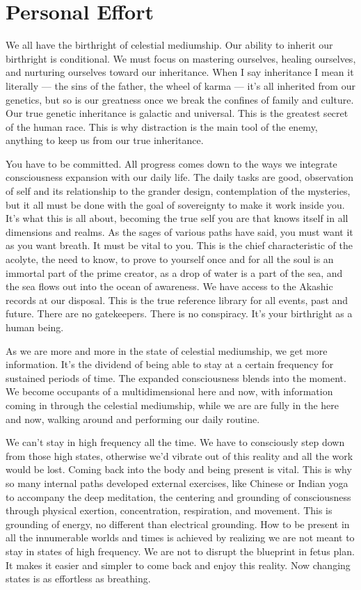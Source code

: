 \documentclass[letterpaper,9pt,twoside,titlepage,onecolumn,openany]{book}
\begin{document}
\section*{Personal Effort}\label{personal-effort}

We all have the birthright of celestial mediumship. Our ability to
inherit our birthright is conditional. We must focus on mastering
ourselves, healing ourselves, and nurturing ourselves toward our
inheritance. When I say inheritance I mean it literally --- the sins of
the father, the wheel of karma --- it's all inherited from our genetics,
but so is our greatness once we break the confines of family and
culture. Our true genetic inheritance is galactic and universal. This is
the greatest secret of the human race. This is why distraction is the
main tool of the enemy, anything to keep us from our true inheritance.

You have to be committed. All progress comes down to the ways we
integrate consciousness expansion with our daily life. The daily tasks
are good, observation of self and its relationship to the grander
design, contemplation of the mysteries, but it all must be done with the
goal of sovereignty to make it work inside you. It's what this is all
about, becoming the true self you are that knows itself in all
dimensions and realms. As the sages of various paths have said, you must
want it as you want breath. It must be vital to you. This is the chief
characteristic of the acolyte, the need to know, to prove to yourself
once and for all the soul is an immortal part of the prime creator, as a
drop of water is a part of the sea, and the sea flows out into the ocean
of awareness. We have access to the Akashic records at our disposal.
This is the true reference library for all events, past and future.
There are no gatekeepers. There is no conspiracy. It's your birthright
as a human being.

As we are more and more in the state of celestial mediumship, we get
more information. It's the dividend of being able to stay at a certain
frequency for sustained periods of time. The expanded consciousness
blends into the moment. We become occupants of a multidimensional here
and now, with information coming in through the celestial mediumship,
while we are are fully in the here and now, walking around and
performing our daily routine.

We can't stay in high frequency all the time. We have to consciously
step down from those high states, otherwise we'd vibrate out of this
reality and all the work would be lost. Coming back into the body and
being present is vital. This is why so many internal paths developed
external exercises, like Chinese or Indian yoga to accompany the deep
meditation, the centering and grounding of consciousness through
physical exertion, concentration, respiration, and movement. This is
grounding of energy, no different than electrical grounding. How to be
present in all the innumerable worlds and times is achieved by realizing
we are not meant to stay in states of high frequency. We are not to
disrupt the blueprint in fetus plan. It makes it easier and simpler to
come back and enjoy this reality. Now changing states is as effortless
as breathing.
\end{document}
